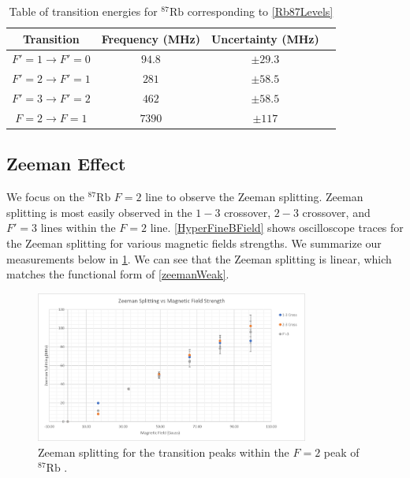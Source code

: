 \documentclass[12pt]{article}
\newcommand{\RbES}{$^{87}\text{Rb}$ }
\begin{document}
	\begin{table}[H]
	\centering
	\begin{tabular}{c c c c}
		\toprule
		\textbf{Transition} & \textbf{Frequency (MHz)} & \textbf{Uncertainty (MHz)}  \\ \midrule
		$F'=1 \rightarrow F'=0$ & $94.8$ & $\pm 29.3$ \\
		$F'=2 \rightarrow F'=1$ & $281$  & $\pm 58.5$ \\
		$F'=3 \rightarrow F'=2$ & $462$  & $\pm 58.5$ \\
		$F=2 \rightarrow F=1$   & $7390$ & $ \pm 117$ \\ 
		\bottomrule
	\end{tabular}
	\caption{Table of transition energies for \RbES corresponding to \cref{Rb87Levels}}
	\label{Rb87Table}
\end{table}
	
	\subsection{Zeeman Effect}
	We focus on the \RbES $F=2$ line to observe the Zeeman splitting. Zeeman splitting is most easily observed in the $1-3$ crossover, $2-3$ crossover, and $F'=3$ lines within the $F=2$ line. \cref{HyperFineBField} shows oscilloscope traces for the Zeeman splitting for various magnetic fields strengths. We summarize our measurements below in \cref{splittingGraph}. We can see that the Zeeman splitting is linear, which matches the functional form of \cref{zeemanWeak}.
	\begin{figure}[H]
		\centering
		\includegraphics[width=0.8\textwidth]{HyperFineBField/SplittingGraph.png}
		\caption{Zeeman splitting for the transition peaks within the $F=2$ peak of \RbES.}
		\label{splittingGraph}
	\end{figure}
	
\end{document}
